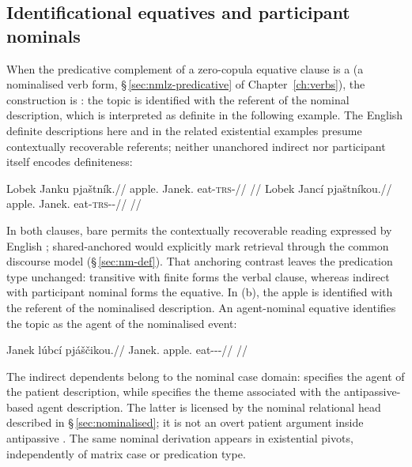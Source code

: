 \subsection{Identificational equatives and participant nominals}%
\label{sec:ident-equative}

When the predicative complement of a zero-copula equative clause is a
 (a nominalised verb form,
§\,\ref{sec:nmlz-predicative} of Chapter~\ref{ch:verbs}), the construction is
: the topic  is identified with the referent
of the nominal description, which is interpreted as definite in the following example.
The English definite descriptions here and in the related existential examples
presume contextually recoverable referents; neither unanchored indirect
 nor participant  itself encodes definiteness:

\pex
\a
\begingl
\gla Lobek Janku pjaštník.//
\glb apple.\Dir{} Janek.\Trs{} eat-\textsc{trs}-\Pf{}//
\glft {} //
\endgl
\a
\begingl
\gla Lobek Jancí pjaštníkou.//
\glb apple.\Dir{} Janek.\Ind{} eat-\textsc{trs}-\Pf{}-\Nmlz{}//
\glft {} //
\endgl
\xe

\noindent In both clauses, bare  permits the contextually
recoverable reading expressed by English ; shared-anchored
 would explicitly mark retrieval through the common discourse
model (§\,\ref{sec:nm-def}). That anchoring contrast leaves the predication
type unchanged: transitive  with finite  forms the
verbal clause, whereas indirect  with participant nominal
 forms the equative. In (b), the apple is identified with the
referent of the nominalised description. An
agent-nominal equative identifies the topic as the agent of the nominalised
event:

\ex
\begingl
\gla Janek lúbcí pjáščikou.//
\glb Janek.\Dir{} apple.\Ind{} eat-\Antip{}-\Pf{}-\Nmlz{}//
\glft {}//
\endgl
\xe

\noindent The indirect dependents belong to the nominal case domain:
 specifies the agent of the patient description, while
 specifies the theme associated with the antipassive-based agent
description. The latter is licensed by the nominal relational head described
in §\,\ref{sec:nominalised}; it is not an overt patient argument inside
antipassive . The same nominal derivation appears in existential
pivots, independently of matrix case or predication type.

